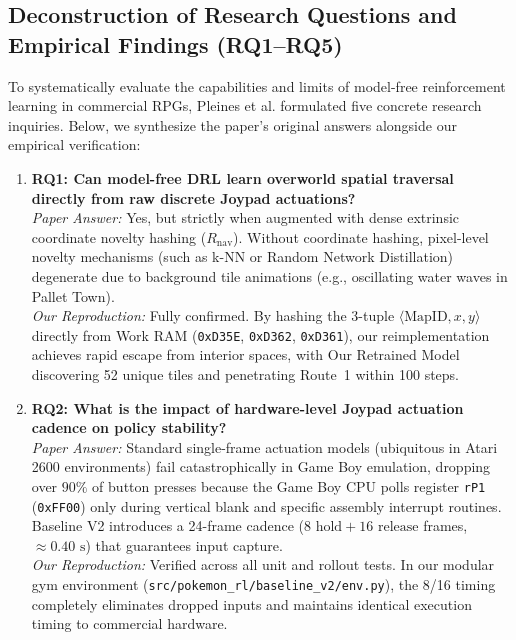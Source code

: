 \documentclass[conference]{IEEEtran}
\begin{document}
\subsection{Deconstruction of Research Questions and Empirical Findings (RQ1--RQ5)}
To systematically evaluate the capabilities and limits of model-free reinforcement learning in commercial RPGs, Pleines et al. formulated five concrete research inquiries. Below, we synthesize the paper's original answers alongside our empirical verification:

\begin{enumerate}
    \item \textbf{RQ1: Can model-free DRL learn overworld spatial traversal directly from raw discrete Joypad actuations?} \\
    \textit{Paper Answer:} Yes, but strictly when augmented with dense extrinsic coordinate novelty hashing ($R_{\text{nav}}$). Without coordinate hashing, pixel-level novelty mechanisms (such as k-NN or Random Network Distillation) degenerate due to background tile animations (e.g., oscillating water waves in Pallet Town). \\
    \textit{Our Reproduction:} Fully confirmed. By hashing the 3-tuple $\langle \text{MapID}, x, y \rangle$ directly from Work RAM (\texttt{0xD35E}, \texttt{0xD362}, \texttt{0xD361}), our reimplementation achieves rapid escape from interior spaces, with Our Retrained Model discovering 52 unique tiles and penetrating Route~1 within 100 steps.

    \item \textbf{RQ2: What is the impact of hardware-level Joypad actuation cadence on policy stability?} \\
    \textit{Paper Answer:} Standard single-frame actuation models (ubiquitous in Atari 2600 environments) fail catastrophically in Game Boy emulation, dropping over $90\%$ of button presses because the Game Boy CPU polls register \texttt{rP1} (\texttt{0xFF00}) only during vertical blank and specific assembly interrupt routines. Baseline V2 introduces a 24-frame cadence ($8\text{ hold} + 16\text{ release}$ frames, $\approx 0.40\text{ s}$) that guarantees input capture. \\
    \textit{Our Reproduction:} Verified across all unit and rollout tests. In our modular gym environment (\texttt{src/pokemon\_rl/baseline\_v2/env.py}), the 8/16 timing completely eliminates dropped inputs and maintains identical execution timing to commercial hardware.


\end{enumerate}
\end{document}
